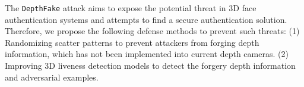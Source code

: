 The \texttt{DepthFake} attack aims to expose the potential threat in 3D face authentication systems and attempts to find a secure authentication solution. Therefore, we propose the following defense methods to prevent such threats:
(1) Randomizing scatter patterns to prevent attackers from forging depth information, which has not been implemented into current depth cameras.
(2) Improving 3D liveness detection models to detect the forgery depth information and adversarial examples.



%




